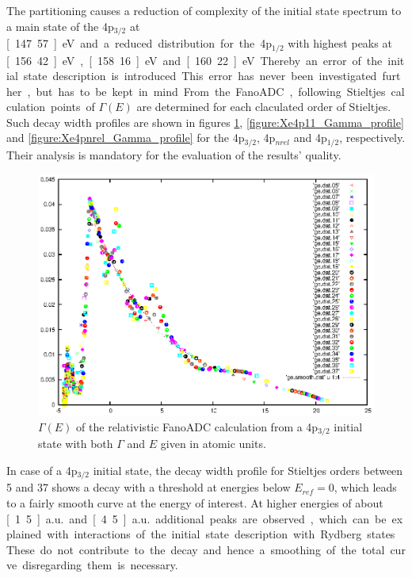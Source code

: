 The partitioning causes a reduction of complexity of the initial state
spectrum to a main state of the 4p$_{3/2}$ at \unit[147.57]{eV} and a
reduced distribution for
the 4p$_{1/2}$ with highest peaks at \unit[156.42]{eV}, \unit[158.16]{eV}
and \unit[160.22]{eV}.
Thereby an error of the initial state description is introduced.
This error has never been investigated further, but has to be kept in mind.

From the FanoADC, following Stieltjes calculation points of $\Gamma(E)$ are
determined for each claculated order of Stieltjes. Such decay width profiles
are shown in figures \ref{figure:Xe4p33_Gamma_profile},
\ref{figure:Xe4p11_Gamma_profile} and \ref{figure:Xe4pnrel_Gamma_profile}
for the 4p$_{3/2}$, 4p$_{nrel}$ and 4p$_{1/2}$, respectively.
Their analysis is mandatory for the evaluation of the results' quality.

\begin{figure}[htb]
  \centering
  \includegraphics[scale=1.0]{pics/Xe4p_33_gammae.eps}
  \caption{$\Gamma(E)$ of the relativistic FanoADC calculation from a 4p$_{3/2}$
           initial state with both $\Gamma$ and $E$ given in atomic units.
           }
  \label{figure:Xe4p33_Gamma_profile}
\end{figure}

In case of a 4p$_{3/2}$ initial state, the decay width profile for Stieltjes
orders between 5 and 37 shows a decay
with a threshold at energies below $E_{ref}=0$, which leads to a fairly smooth
curve at the energy of interest.
At higher energies of about \unit[1.5]{a.u.} and
\unit[4.5]{a.u.} additional peaks are observed, which can be explained with
interactions of the initial state description with Rydberg states. These do not
contribute to the decay and hence a smoothing of the total curve disregarding them
is necessary.

